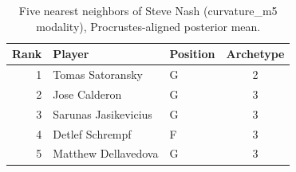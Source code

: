 \begin{table}[htbp]
  \centering\small
  \begin{tabular}{rllc}
    \toprule
    Rank & Player & Position & Archetype \\
    \midrule
    1 & Tomas Satoransky & G & 2 \\
    2 & Jose Calderon & G & 3 \\
    3 & Sarunas Jasikevicius & G & 3 \\
    4 & Detlef Schrempf & F & 3 \\
    5 & Matthew Dellavedova & G & 3 \\
    \bottomrule
  \end{tabular}
  \caption{Five nearest neighbors of Steve Nash (curvature_m5 modality), Procrustes-aligned posterior mean.}
  \label{tab:Steve_Nash_neighbors_curvature_m5}
\end{table}

